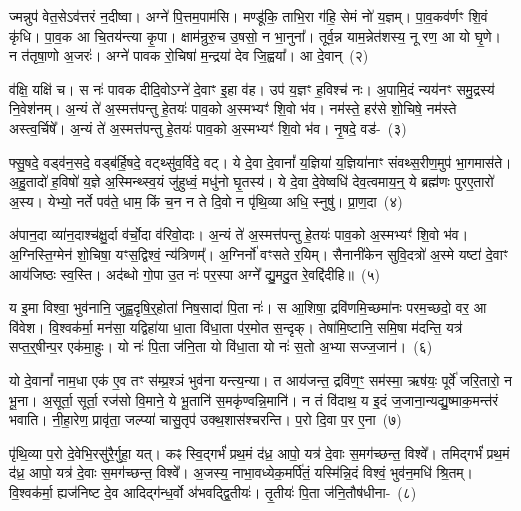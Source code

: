 ज्मन्नुप॑ वेत॒से\-ऽव॑त्तरं न॒दीष्वा। अग्ने॑ पि॒त्तम॒पाम॑सि। मण्डू॑कि॒ ताभि॒रा ग॑हि॒ सेमं नो॑ य॒ज्ञम्। पा॒व॒कव॑र्णꣳ शि॒वं कृ॑धि। पा॒व॒क आ चि॒तय॑न्त्या कृ॒पा। क्षाम॑न्रुरु॒च उ॒षसो॒ न भा॒नुना᳚। तूर्व॒न्न याम॒न्नेत॑शस्य॒ नू रण॒ आ यो घृ॒णे। न त॑तृषा॒णो अ॒जरः॑। अग्ने॑ पावक रो॒चिषा॑ म॒न्द्रया॑ देव जि॒ह्वया᳚। आ दे॒वान्~(२)\ip

व॑क्षि॒ यक्षि॑ च। स नः॑ पावक दीदि॒वो\-ऽग्ने॑ दे॒वाꣳ इ॒हा व॑ह। उप॑ य॒ज्ञꣳ ह॒विश्च॑ नः। अ॒पामि॒दं न्यय॑नꣳ समु॒द्रस्य॑ नि॒वेश॑नम्। अ॒न्यं ते॑ अ॒स्मत्त॑पन्तु हे॒तयः॑ पाव॒को अ॒स्मभ्यꣳ॑ शि॒वो भ॑व। नम॑स्ते॒ हर॑से शो॒चिषे॒ नम॑स्ते अस्त्व॒र्चिषे᳚। अ॒न्यं ते॑ अ॒स्मत्त॑पन्तु हे॒तयः॑ पाव॒को अ॒स्मभ्यꣳ॑ शि॒वो भ॑व। नृ॒षदे॒ वड॑-~(३)\ip

फ्सु॒षदे॒ वड्व॑न॒सदे॒ वड्ब॑र्\mbox{}हि॒षदे॒ वट्थ्सु॑व॒र्विदे॒ वट्। ये दे॒वा दे॒वानां᳚ य॒ज्ञिया॑ य॒ज्ञिया॑नाꣳ संवथ्स॒रीण॒मुप॑ भा॒गमास॑ते। अ॒हु॒तादो॑ ह॒विषो॑ य॒ज्ञे अ॒स्मिन्थ्स्व॒यं जु॑हुध्वं॒ मधु॑नो घृ॒तस्य॑। ये दे॒वा दे॒वेष्वधि॑ देव॒त्वमाय॒न्॒ ये ब्रह्म॑णः पुरए॒तारो॑ अ॒स्य। येभ्यो॒ नर्ते पव॑ते॒ धाम॒ किं च॒न न ते दि॒वो न पृ॑थि॒व्या अधि॒ स्नुषु॑। प्रा॒ण॒दा~(४)\ip

अ॑पान॒दा व्या॑न॒दाश्च॑क्षु॒र्दा व॑र्चो॒दा व॑रिवो॒दाः। अ॒न्यं ते॑ अ॒स्मत्त॑पन्तु हे॒तयः॑ पाव॒को अ॒स्मभ्यꣳ॑ शि॒वो भ॑व। अ॒ग्निस्ति॒ग्मेन॑ शो॒चिषा॒ यꣳस॒द्विश्वं॒ न्य॑त्रिणम्᳚। अ॒ग्निर्नो॑ वꣳसते र॒यिम्। सैनानी॑केन सुवि॒दत्रो॑ अ॒स्मे यष्टा॑ दे॒वाꣳ आय॑जिष्ठः स्व॒स्ति। अद॑ब्धो गो॒पा उ॒त नः॑ पर॒स्पा अग्ने᳚ द्यु॒मदु॒त रे॒वद्दि॑दीहि॥~(५)\ip

{\anuvakamend[{उप॑ दे॒वान् वट्प्रा॑ण॒दाश्चतु॑श्चत्वारिꣳशच्च}]}

य इ॒मा विश्वा॒ भुव॑नानि॒ जुह्व॒दृषि॒र्॒\mbox{}होता॑ निष॒सादा॑ पि॒ता नः॑। स आ॒शिषा॒ द्रवि॑णमि॒च्छमा॑नः परम॒च्छदो॒ वर॒ आ वि॑वेश। वि॒श्वक॑र्मा॒ मन॑सा॒ यद्विहा॑या धा॒ता वि॑धा॒ता प॑र॒मोत स॒न्दृक्। तेषा॑मि॒ष्टानि॒ समि॒षा म॑दन्ति॒ यत्र॑ सप्त॒र्॒\mbox{}षीन्प॒र एक॑मा॒हुः। यो नः॑ पि॒ता ज॑नि॒ता यो वि॑धा॒ता यो नः॑ स॒तो अ॒भ्या सज्ज॒जान॑।~(६)\ip

यो दे॒वानां᳚ नाम॒धा एक॑ ए॒व तꣳ स॑म्प्र॒श्ञं भुव॑ना यन्त्य॒न्या। त आय॑जन्त॒ द्रवि॑ण॒ꣳ॒ सम॑स्मा॒ ऋष॑यः॒ पूर्वे॑ जरि॒तारो॒ न भू॒ना। अ॒सूर्ता॒ सूर्ता॒ रज॑सो वि॒माने॒ ये भू॒तानि॑ स॒मकृ॑ण्वन्नि॒मानि॑। न तं वि॑दाथ॒ य इ॒दं ज॒जाना॒न्यद्यु॒ष्माक॒मन्त॑रं भवाति। नी॒हा॒रेण॒ प्रावृ॑ता॒ जल्प्या॑ चासु॒तृप॑ उक्थ॒शास॑श्चरन्ति। प॒रो दि॒वा प॒र ए॒ना~(७)\ip

पृ॑थि॒व्या प॒रो दे॒वेभि॒रसु॑रै॒र्गुहा॒ यत्। कꣴ स्वि॒द्गर्भं॑ प्रथ॒मं द॑ध्र॒ आपो॒ यत्र॑ दे॒वाः स॒मग॑च्छन्त॒ विश्वे᳚। तमिद्गर्भं॑ प्रथ॒मं द॑ध्र॒ आपो॒ यत्र॑ दे॒वाः स॒मग॑च्छन्त॒ विश्वे᳚। अ॒जस्य॒ नाभा॒वध्येक॒मर्पि॑तं॒ यस्मि॑न्नि॒दं विश्वं॒ भुव॑न॒\-मधि॑ श्रि॒तम्। वि॒श्वक॑र्मा॒ ह्यज॑निष्ट दे॒व आदिद्ग॑न्ध॒र्वो अ॑भवद्द्वि॒तीयः॑। तृ॒तीयः॑ पि॒ता ज॑नि॒तौष॑धीना-~(८)\ip

